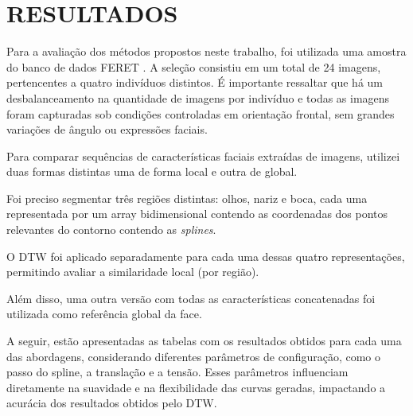 \chapter{RESULTADOS} \label{cha:resultados}

Para a avaliação dos métodos propostos neste trabalho, foi utilizada uma amostra do banco de dados FERET \cite{FERET1,FERET2}. A seleção consistiu em um total de 24 imagens, pertencentes a quatro indivíduos distintos. É importante ressaltar que há um desbalanceamento na quantidade de imagens por indivíduo e todas as imagens foram capturadas sob condições controladas em orientação frontal, sem grandes variações de ângulo ou expressões faciais.

Para comparar sequências de características faciais extraídas de imagens, utilizei duas formas distintas uma de forma local e outra de global.

Foi preciso segmentar três regiões distintas: olhos, nariz e boca, cada uma representada por um array bidimensional contendo as coordenadas dos pontos relevantes do contorno contendo as \textit{splines}.

O DTW foi aplicado separadamente para cada uma dessas quatro representações, permitindo avaliar a similaridade local (por região).

Além disso, uma outra versão com todas as características concatenadas foi utilizada como referência global da face.

A seguir, estão apresentadas as tabelas com os resultados obtidos para cada uma das abordagens, considerando diferentes parâmetros de configuração, como o passo do spline, a translação e a tensão. Esses parâmetros influenciam diretamente na suavidade e na flexibilidade das curvas geradas, impactando a acurácia dos resultados obtidos pelo DTW.


